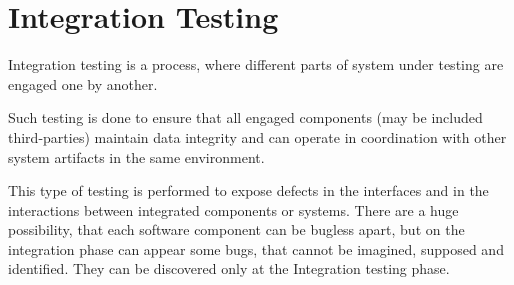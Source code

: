 \section{Integration Testing}
\label{sec:Integration Testing}

Integration testing is a process, where different parts of system under testing are engaged one by another.

Such testing is done to ensure that all engaged components (may be included third-parties) maintain data integrity and can operate in coordination with other system artifacts in the same environment.

This type of testing is performed to expose defects in the interfaces and in the interactions between integrated components or systems. There are a huge possibility, that each software component can be bugless apart, but on the integration phase can appear some bugs, that cannot be imagined, supposed and identified. They can be discovered only at the Integration testing phase.